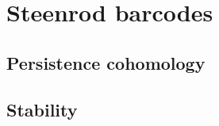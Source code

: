 
\section{Steenrod barcodes}\label{s:steenrod}

\TBW

\subsection{Persistence cohomology}\label{ss:cohomology}

\subsection{Stability}\label{ss:stability}

